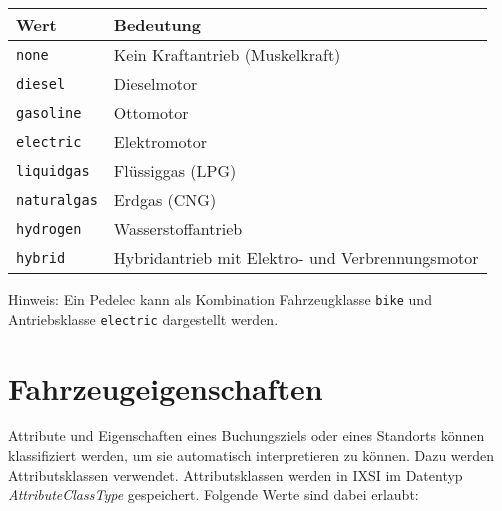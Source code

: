 \begin{flushleft}
\begin{tabularx}{\linewidth}{l>{\raggedright\arraybackslash}X}
\toprule
Wert & Bedeutung\\
\midrule
\verb|none| & Kein Kraftantrieb (Muskelkraft)\\
\verb|diesel| & Dieselmotor\\
\verb|gasoline| & Ottomotor\\
\verb|electric| & Elektromotor\\
\verb|liquidgas| & Flüssiggas (LPG)\\
\verb|naturalgas| & Erdgas (CNG)\\
\verb|hydrogen| & Wasserstoffantrieb\\
\verb|hybrid| & Hybridantrieb mit Elektro- und Verbrennungsmotor\\
\bottomrule
\end{tabularx}
\end{flushleft}

Hinweis: Ein Pedelec kann als Kombination Fahrzeugklasse \verb|bike| und Antriebsklasse \verb|electric| dargestellt werden.

\section{Fahrzeugeigenschaften}
\label{sec:CodeTabellen:AttributeClass}
Attribute und Eigenschaften eines Buchungsziels oder eines Standorts können klassifiziert werden, um sie automatisch interpretieren zu können. Dazu werden Attributsklassen verwendet. Attributsklassen werden in IXSI im Datentyp \emph{AttributeClassType} gespeichert. Folgende Werte sind dabei erlaubt:

